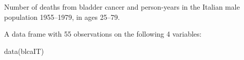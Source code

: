 \begin{Description}\relax
Number of deaths from bladder cancer and person-years in the Italian
male population 1955--1979, in ages 25--79.
\end{Description}
\begin{Format}\relax
A data frame with 55 observations on the following 4 variables:
\end{Format}
\begin{Examples}
\begin{ExampleCode}
data(blcaIT)
\end{ExampleCode}
\end{Examples}

